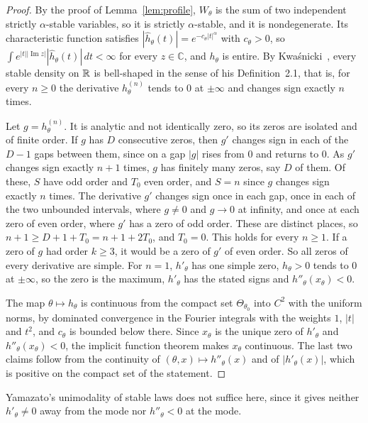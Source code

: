 \begin{proof}
By the proof of Lemma~\ref{lem:profile}, $W_\theta$ is the sum of two independent strictly
$\alpha$-stable variables, so it is strictly $\alpha$-stable, and it is nondegenerate. Its
characteristic function satisfies $|\widehat h_\theta(t)|=e^{-c_\theta|t|^\alpha}$ with
$c_\theta>0$, so $\int e^{|t||\operatorname{Im}z|}|\widehat h_\theta(t)|\,dt<\infty$ for every
$z\in\mathbb C$, and $h_\theta$ is entire. By Kwa\'snicki~\cite[Corollary~1.3]{kwasnicki2020},
every stable density on $\mathbb{R}$ is bell-shaped in the sense of his Definition~2.1, that is, for every
$n\ge0$ the derivative $h^{(n)}_\theta$ tends to $0$ at $\pm\infty$ and changes sign exactly $n$
times.

Let $g=h^{(n)}_\theta$. It is analytic and not identically zero, so its zeros are isolated and of
finite order. If $g$ has $D$ consecutive zeros, then $g'$ changes sign in each of the $D-1$ gaps
between them, since on a gap $|g|$ rises from $0$ and returns to $0$. As $g'$ changes sign
exactly $n+1$ times, $g$ has finitely many zeros, say $D$ of them. Of these, $S$ have odd order
and $T_0$ even order, and $S=n$ since $g$ changes sign exactly $n$ times. The derivative $g'$
changes sign once in each gap, once in each of the two unbounded intervals, where $g\ne0$ and
$g\to0$ at infinity, and once at each zero of even order, where $g'$ has a zero of odd order.
These are distinct places, so $n+1\ge D+1+T_0=n+1+2T_0$, and $T_0=0$. This holds for every $n\ge1$.
If a zero of $g$ had order $k\ge3$, it would be a zero of $g'$ of even order. So all zeros of
every derivative are simple. For $n=1$, $h'_\theta$ has one simple zero, $h_\theta>0$ tends to
$0$ at $\pm\infty$, so the zero is the maximum, $h'_\theta$ has the stated signs and
$h''_\theta(x_\theta)<0$.

The map $\theta\mapsto h_\theta$ is continuous from the compact set $\Theta_{\theta_0}$ into
$C^2$ with the uniform norms, by dominated convergence in the Fourier integrals with the weights
$1$, $|t|$ and $t^2$, and $c_\theta$ is bounded below there. Since $x_\theta$ is the unique zero of
$h'_\theta$ and $h''_\theta(x_\theta)<0$, the implicit function theorem makes $x_\theta$
continuous. The last two claims follow from the continuity of $(\theta,x)\mapsto h''_\theta(x)$
and of $|h'_\theta(x)|$, which is positive on the compact set of the statement.
\end{proof}

Yamazato's unimodality of stable laws does not suffice here, since it gives neither
$h'_\theta\ne0$ away from the mode nor $h''_\theta<0$ at the mode.

